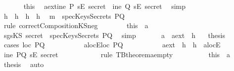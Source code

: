 \begin{isabellebody}
\ \ \ \ \ \isamarkupfalse%
\ this\ \isamarkupfalse%
\ a{}{}ext{\isacharcolon}{\isachardoublequoteopen}ine\ P\ {\isacharparenleft}sE\ secret{\isacharparenright}\ {\isacharbar}\ ine\ Q\ {\isacharparenleft}sE\ secret{\isacharparenright}{\isachardoublequoteclose}\ \isamarkupfalse%
\ simp\isanewline
\ \ \ \ \ \isamarkupfalse%
\ h{}\ \ h{}\ \ h{}\ \ h{}\ \isamarkupfalse%
\ {\isachardoublequoteopen}m\ {\isasymnotin}\ specKeysSecrets\ PQ{\isachardoublequoteclose}\ \isanewline
\ \ \ \ \ \ \ \isamarkupfalse%
\ {\isacharparenleft}rule\ correctCompositionKS{\isacharunderscore}neg{}{\isacharparenright}\ \isanewline
\ \ \ \ \ \isamarkupfalse%
\ this\ \ a{}\ \isamarkupfalse%
\ sg{}{\isacharcolon}{\isachardoublequoteopen}sKS\ secret\ {\isasymnotin}\ specKeysSecrets\ PQ{\isachardoublequoteclose}\ \isamarkupfalse%
\ simp\isanewline
\ \ \ \ \ \isamarkupfalse%
\ a{}\ \ a{}{}ext\ \ h{}\ \ \isamarkupfalse%
\ {\isacharquery}thesis\isanewline
\ \ \ \ \ \isamarkupfalse%
\ {\isacharparenleft}cases\ {\isachardoublequoteopen}loc\ PQ\ {\isacharequal}\ {\isacharbraceleft}{\isacharbraceright}{\isachardoublequoteclose}{\isacharparenright}\isanewline
\ \ \ \ \ \ \ \isamarkupfalse%
\ a{}{}locE{\isacharcolon}{\isachardoublequoteopen}loc\ PQ\ {\isacharequal}\ {\isacharbraceleft}{\isacharbraceright}{\isachardoublequoteclose}\isanewline
\ \ \ \ \ \ \ \isamarkupfalse%
\ a{}{}ext\ \ h{}\ \ h{}\ \ a{}{}locE\ \isamarkupfalse%
\ {\isachardoublequoteopen}ine\ PQ\ {\isacharparenleft}sE\ secret{\isacharparenright}{\isachardoublequoteclose}\ \isanewline
\ \ \ \ \ \ \ \ \ \isamarkupfalse%
\ {\isacharparenleft}rule\ TBtheorem{}a{\isacharunderscore}empty{\isacharparenright}\ \isanewline
\ \ \ \ \ \ \ \isamarkupfalse%
\ this\ \ a{}\ \isamarkupfalse%
\ {\isacharquery}thesis\ \isamarkupfalse%
\ auto\isanewline
\ \ \ \ \ \isamarkupfalse%
\ \isanewline
\ \ \ \ \ \ \ \isamarkupfalse%

\end{isabellebody}
